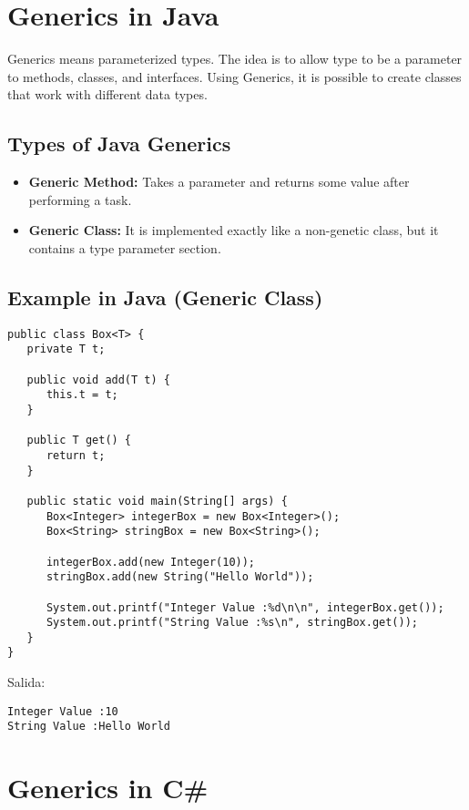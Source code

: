 \documentclass[
	12pt, %
]{fphw}
\begin{document}
\newpage
\section*{{\color{Cerulean}Generics in Java}}

Generics means parameterized types. The idea is to allow type to be a parameter to methods, classes, and interfaces. Using Generics, it is possible to create classes that work with different data types.

\subsection*{Types of Java Generics}

\begin{itemize}
\item \textbf{Generic Method:} Takes a parameter and returns some value after performing a task.
\item \textbf{Generic Class:} It is implemented exactly like a non-genetic class, but it contains a type parameter section.
\end{itemize}

\subsection*{Example in Java (Generic Class)}

\begin{verbatim}
public class Box<T> {
   private T t;

   public void add(T t) {
      this.t = t;
   }

   public T get() {
      return t;
   }

   public static void main(String[] args) {
      Box<Integer> integerBox = new Box<Integer>();
      Box<String> stringBox = new Box<String>();
    
      integerBox.add(new Integer(10));
      stringBox.add(new String("Hello World"));

      System.out.printf("Integer Value :%d\n\n", integerBox.get());
      System.out.printf("String Value :%s\n", stringBox.get());
   }
}
\end{verbatim}

Salida:
\begin{verbatim}
Integer Value :10
String Value :Hello World
\end{verbatim}

\newpage
\section*{{\color{RoyalPurple}Generics in C\#}}
\end{document}
